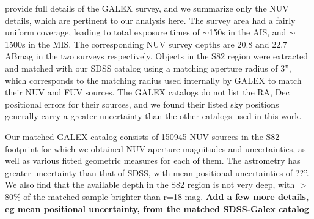 \documentclass{aastex63}
\begin{document}
\citet{2017ApJS..230...24B} provide full details of the GALEX survey, and we summarize only the NUV details, which are pertinent to our analysis here. The survey area had a fairly uniform coverage, leading to total exposure times of $\sim$150s in the AIS, and $\sim$1500s in the MIS. The corresponding NUV survey depths are 20.8 and 22.7 ABmag in the two surveys respectively. Objects in the S82 region were extracted and matched with our SDSS catalog using a matching aperture radius of 3'', which corresponds to the matching radius used internally by GALEX to match their NUV and FUV sources. The GALEX catalogs do not list the RA, Dec positional errors for their sources, and we found their listed sky positions generally carry a greater uncertainty than the other catalogs used in this work.

Our matched GALEX catalog consists of 150945 NUV sources in the S82 footprint for which we obtained NUV aperture magnitudes and uncertainties, as well as various fitted geometric measures for each of them. The astrometry has greater uncertainty than that of SDSS, with mean positional uncertainties of ??''. We also find that the available depth in the S82 region is not very deep, with $>$80\% of the matched sample brighter than r=18 mag. {\bf Add a few more details, eg mean positional uncertainty, from the matched SDSS-Galex catalog}
  

 

 
\end{document}
